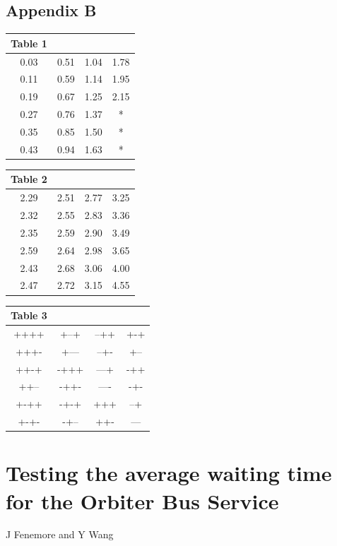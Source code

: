 \subsection*{Appendix B}
\begin{center}
{\scriptsize
\begin{tabular}{|cccc|}\hline
Table 1&&&\\\hline
0.03&	0.51&	1.04&	1.78\\
0.11&	0.59&	1.14&	1.95\\
0.19&	0.67&	1.25&	2.15\\
0.27&	0.76&	1.37&	*\\
0.35&	0.85&	1.50&	*\\
0.43&	0.94&	1.63&	*\\ \hline
\end{tabular}
\begin{tabular}{|cccc|}\hline
Table 2&&&\\\hline
2.29&	2.51&	2.77&	3.25\\
2.32&	2.55&	2.83&	3.36\\
2.35&	2.59&	2.90&	3.49\\
2.59&	2.64&	2.98&	3.65\\
2.43&	2.68&	3.06&	4.00\\
2.47&	2.72&	3.15&	4.55\\ \hline
\end{tabular}
\begin{tabular}{|cccc|}\hline
Table 3&&&\\\hline
++++&	+--+&	--++&	+-+\\
+++-&	+---&	--+-&	+--\\
++-+&	-+++&	---+&	-++\\
++--&	-++-&	----&	-+-\\
+-++&	-+-+&	+++&	--+\\
+-+-&	-+--&	++-&	---\\ \hline
\end{tabular}
}
\end{center}
\newpage
\section{Testing the average waiting time for the Orbiter Bus Service}
\begin{center}
J Fenemore and Y Wang
\end{center}



